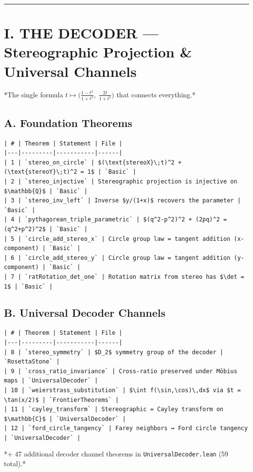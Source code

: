 \documentclass[12pt,a4paper,openany]{book}
\begin{document}
\bigskip\hrule\bigskip

\section{I. THE DECODER — Stereographic Projection \& Universal Channels}

*The single formula $t \mapsto \bigl(\tfrac{1-t^2}{1+t^2},\;\tfrac{2t}{1+t^2}\bigr)$ that connects everything.*

\subsection{A. Foundation Theorems}

\begin{verbatim}
| # | Theorem | Statement | File |
|---|---------|-----------|------|
| 1 | `stereo_on_circle` | $(\text{stereoX}\;t)^2 + (\text{stereoY}\;t)^2 = 1$ | `Basic` |
| 2 | `stereo_injective` | Stereographic projection is injective on $\mathbb{Q}$ | `Basic` |
| 3 | `stereo_inv_left` | Inverse $y/(1+x)$ recovers the parameter | `Basic` |
| 4 | `pythagorean_triple_parametric` | $(q^2-p^2)^2 + (2pq)^2 = (q^2+p^2)^2$ | `Basic` |
| 5 | `circle_add_stereo_x` | Circle group law = tangent addition (x-component) | `Basic` |
| 6 | `circle_add_stereo_y` | Circle group law = tangent addition (y-component) | `Basic` |
| 7 | `ratRotation_det_one` | Rotation matrix from stereo has $\det = 1$ | `Basic` |
\end{verbatim}

\subsection{B. Universal Decoder Channels}

\begin{verbatim}
| # | Theorem | Statement | File |
|---|---------|-----------|------|
| 8 | `stereo_symmetry` | $D_2$ symmetry group of the decoder | `RosettaStone` |
| 9 | `cross_ratio_invariance` | Cross-ratio preserved under Möbius maps | `UniversalDecoder` |
| 10 | `weierstrass_substitution` | $\int f(\sin,\cos)\,dx$ via $t = \tan(x/2)$ | `FrontierTheorems` |
| 11 | `cayley_transform` | Stereographic = Cayley transform on $\mathbb{C}$ | `UniversalDecoder` |
| 12 | `ford_circle_tangency` | Farey neighbors ↔ Ford circle tangency | `UniversalDecoder` |
\end{verbatim}

*+ 47 additional decoder channel theorems in \texttt{UniversalDecoder.lean} (59 total).*
\end{document}

